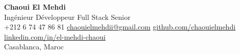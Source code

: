 \documentclass[10pt,a4paper]{article}
\newcommand{\cvname}[1]{{\Huge\bfseries #1}}
\newcommand{\cvtitle}[1]{{\Large\color{cvgray} #1}}
\begin{document}
\begin{center}
    \cvname{Chaoui El Mehdi}\\[2pt]
    \cvtitle{Ingénieur Développeur Full Stack Senior}\\[6pt]
    +212 6 74 47 86 81 \;\textbar\;
    \href{mailto:chaouielmehdii@gmail.com}{chaouielmehdii@gmail.com} \;\textbar\;
    \href{https://github.com/chaouielmehdi}{github.com/chaouielmehdi} \;\textbar\;
    \href{https://linkedin.com/in/el-mehdi-chaoui}{linkedin.com/in/el-mehdi-chaoui}\\[2pt]
    Casablanca, Maroc
\end{center}

\vspace{-4pt}







\end{document}
